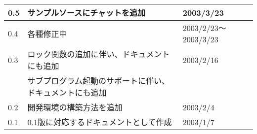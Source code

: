 
\begin{tabular}{|l|l|l|}
\hline
0.5&サンプルソースにチャットを追加&2003/3/23\\
\hline
0.4&各種修正中&2003/2/23〜2003/3/23\\
\hline
0.3&ロック関数の追加に伴い、ドキュメントにも追加 &2003/2/16\\
   &サブプログラム起動のサポートに伴い、ドキュメントにも追加 & \\
\hline
0.2&開発環境の構築方法を追加 & 2003/2/4\\
\hline
0.1&0.1版に対応するドキュメントとして作成&2003/1/7\\
\hline
\end{tabular}